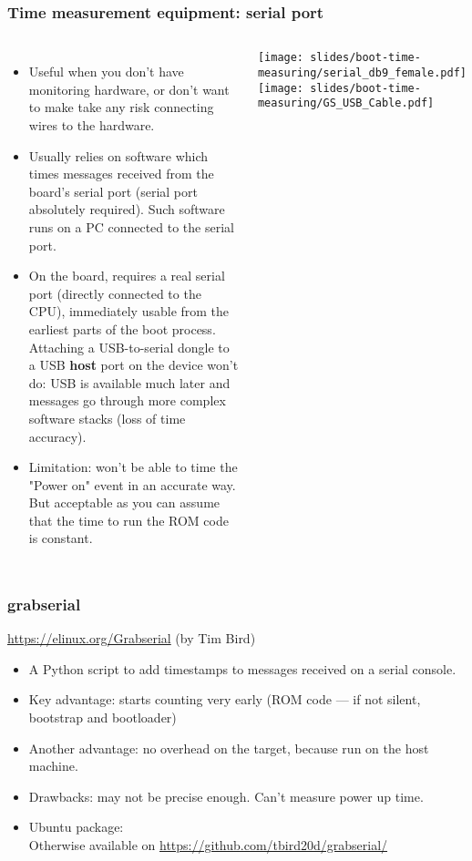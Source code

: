 \begin{frame}
\frametitle{Time measurement equipment: serial port}
\begin{columns}
\small
\begin{itemize}
\item Useful when you don't have monitoring hardware, or don't want to make
      take any risk connecting wires to the hardware.
\item Usually relies on software which times messages received from the board's
      serial port (serial port absolutely required). Such software
      runs on a PC connected to the serial port.
\item On the board, requires a real serial port (directly connected to the CPU),
      immediately usable from the earliest parts of the boot process.
      Attaching a USB-to-serial dongle to a USB {\bf host} port on
      the device won't do: USB is available much later and messages
      go through more complex software stacks (loss of time accuracy).
\item Limitation: won't be able to time the "Power on" event in
      an accurate way. But acceptable as you can assume that
      the time to run the ROM code is constant.
\end{itemize}
\texttt{[image: slides/boot-time-measuring/serial\_db9\_female.pdf]}\\
\vspace{1cm}
\texttt{[image: slides/boot-time-measuring/GS\_USB\_Cable.pdf]}
\end{columns}
\end{frame}

\begin{frame}
\frametitle{grabserial}
\url{https://elinux.org/Grabserial} (by Tim Bird)
\begin{itemize}
\item A Python script to add timestamps to messages received on a
      serial console.
\item Key advantage: starts counting very early (ROM code --- if not
      silent, bootstrap and bootloader)
\item Another advantage: no overhead on the target, because run on the host machine.
\item Drawbacks: may not be precise enough. Can't measure power up time.
\item Ubuntu package: \\
      Otherwise available on \url{https://github.com/tbird20d/grabserial/}
\end{itemize}
\end{frame}

